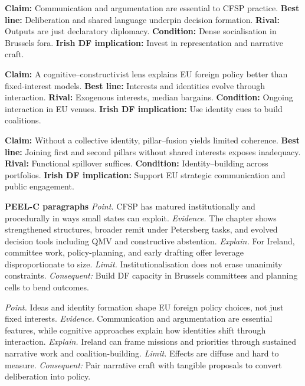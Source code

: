 \textbf{Claim:} Communication and argumentation are essential to CFSP practice. \textbf{Best line:} Deliberation and shared language underpin decision formation. \textbf{Rival:} Outputs are just declaratory diplomacy. \textbf{Condition:} Dense socialisation in Brussels fora. \textbf{Irish DF implication:} Invest in representation and narrative craft.

\textbf{Claim:} A cognitive–constructivist lens explains EU foreign policy better than fixed-interest models. \textbf{Best line:} Interests and identities evolve through interaction. \textbf{Rival:} Exogenous interests, median bargains. \textbf{Condition:} Ongoing interaction in EU venues. \textbf{Irish DF implication:} Use identity cues to build coalitions.

\textbf{Claim:} Without a collective identity, pillar–fusion yields limited coherence. \textbf{Best line:} Joining first and second pillars without shared interests exposes inadequacy. \textbf{Rival:} Functional spillover suffices. \textbf{Condition:} Identity–building across portfolios. \textbf{Irish DF implication:} Support EU strategic communication and public engagement.

\textbf{PEEL-C paragraphs}
\textit{Point.} CFSP has matured institutionally and procedurally in ways small states can exploit. \textit{Evidence.} The chapter shows strengthened structures, broader remit under Petersberg tasks, and evolved decision tools including QMV and constructive abstention. \textit{Explain.} For Ireland, committee work, policy-planning, and early drafting offer leverage disproportionate to size. \textit{Limit.} Institutionalisation does not erase unanimity constraints. \textit{Consequent:} Build DF capacity in Brussels committees and planning cells to bend outcomes.

\textit{Point.} Ideas and identity formation shape EU foreign policy choices, not just fixed interests. \textit{Evidence.} Communication and argumentation are essential features, while cognitive approaches explain how identities shift through interaction. \textit{Explain.} Ireland can frame missions and priorities through sustained narrative work and coalition-building. \textit{Limit.} Effects are diffuse and hard to measure. \textit{Consequent:} Pair narrative craft with tangible proposals to convert deliberation into policy.



